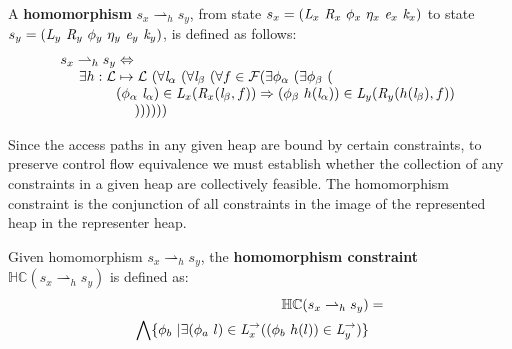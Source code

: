 \begin{definition}
\label{def:homomorphism}
A \textbf{homomorphism} $s_x \rightharpoonup_{h} s_y$, from state $s_x = ( \cfgnt{L}_x\ \cfgnt{R}_x\ \phi_x\ \eta_x\ \cfgnt{e}_x\ \cfgnt{k}_x )$ to state $s_y = ( \cfgnt{L}_y\ \cfgnt{R}_y\ \phi_y\ \eta_y\ \cfgnt{e}_y\ \cfgnt{k}_y )$, is defined as follows: 
$$
\begin{array}{l}
 s_x \rightharpoonup_{h} s_y \Leftrightarrow \\
\ \ \ \ \exists h: \mathcal{L} \mapsto \mathcal{L}\ (\forall \cfgnt{l}_\alpha\ (\forall \cfgnt{l}_\beta\ (\forall f \in \mathcal{F}( \exists \phi_\alpha\ (\exists \phi_\beta\ ( \\ 
\ \ \ \ \ \ \ \ \ \ \ \ (\phi_\alpha\ \cfgnt{l}_\alpha) \in \cfgnt{L}_x(\cfgnt{R}_x (\cfgnt{l}_\beta,f )) \Rightarrow (\phi_\beta\ h(\cfgnt{l}_\alpha))\in \cfgnt{L}_y(\cfgnt{R}_y (h(\cfgnt{l}_\beta),f ))\ \\
\ \ \ \ \ \ \ \ \ \ \ \ \ \ \ \  )) ) ) ) )
\end{array}
$$
\begin{comment}
$$
\begin{array}{l}
s_x \rightharpoonup_{h} s_y \Leftrightarrow \\
\ \ \ \ \exists h: \mathcal{L} \mapsto \mathcal{L}\ (\forall \cfgnt{l}_\beta\ (\forall f \in \mathit{fields}(\mathrm{type}(\cfgnt{l}_\beta))\ ( \\
\ \ \ \ \ \ \ \ \ \ \ \ \forall (\phi_\alpha\ \cfgnt{l}_\alpha) \in \cfgnt{L}_x(\cfgnt{R}_x (\cfgnt{l}_\beta,f ))\ ( \\
\ \ \ \ \ \ \ \ \ \ \ \ \ \ \ \ \exists \phi_\beta\ ((\phi_\beta\ h(\cfgnt{l}_\alpha))\in \cfgnt{L}_y(\cfgnt{R}_y (h(\cfgnt{l}_\beta),f )))))))\\
\end{array}
$$
\end{comment}
\end{definition}

Since the access paths in any given heap are bound by certain constraints, to preserve control flow equivalence we must establish whether the collection of any constraints in a given heap are collectively feasible. The homomorphism constraint is the conjunction of all constraints in the image of the represented heap in the representer heap.

\begin{definition}
\label{def:hc}
Given homomorphism $s_x \rightharpoonup_{h} s_y$, the \textbf{homomorphism constraint} $\mathbb{HC}(s_x \rightharpoonup_{h} s_y)$ is defined as:
\begin{align*}
\mathbb{HC}(s_x \rightharpoonup_{h} s_y) &= \\
 \bigwedge \{ \phi_b\ | \exists (\phi_a\ l) \in \emph{L}_x^\rightarrow ( (\phi_b\ h(l)) \in \emph{L}_y^\rightarrow)\} 
\end{align*}
\end{definition}

